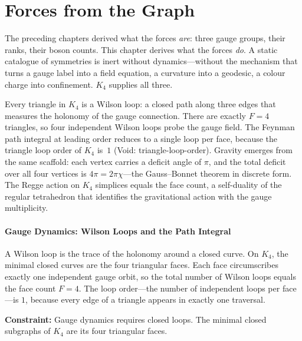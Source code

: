 \documentclass[11pt,a4paper]{book}
\def\texttt#1{#1}%
\begin{document}
\chapter{Forces from the Graph}
\label{ch:forces-from-graph}

The preceding chapters derived what the forces \emph{are}: three gauge groups,
their ranks, their boson counts.  This chapter derives what the forces
\emph{do}.  A static catalogue of symmetries is inert without dynamics---without
the mechanism that turns a gauge label into a field equation, a curvature
into a geodesic, a colour charge into confinement.  $K_4$ supplies all three.

Every triangle in $K_4$ is a Wilson loop: a closed path along three edges
that measures the holonomy of the gauge connection.  There are exactly
$F = 4$ triangles, so four independent Wilson loops probe the gauge field.
The Feynman path integral at leading order reduces to a single loop per face,
because the triangle loop order of $K_4$ is~$1$ (Void: \texttt{triangle-loop-order}).
Gravity emerges from the same scaffold: each vertex carries a deficit angle
of $\pi$, and the total deficit over all four vertices is $4\pi = 2\pi \chi$---the
Gauss--Bonnet theorem in discrete form.  The Regge action on $K_4$ simplices
equals the face count, a self-duality of the regular tetrahedron that identifies
the gravitational action with the gauge multiplicity.

\subsubsection*{Gauge Dynamics: Wilson Loops and the Path Integral}

A Wilson loop is the trace of the holonomy around a closed curve.  On $K_4$,
the minimal closed curves are the four triangular faces.  Each face circumscribes
exactly one independent gauge orbit, so the total number of Wilson loops equals
the face count $F = 4$.  The loop order---the number of independent loops per
face---is $1$, because every edge of a triangle appears in exactly one traversal.

\textbf{Constraint:}
Gauge dynamics requires closed loops.  The minimal closed subgraphs of $K_4$
are its four triangular faces.
\end{document}
